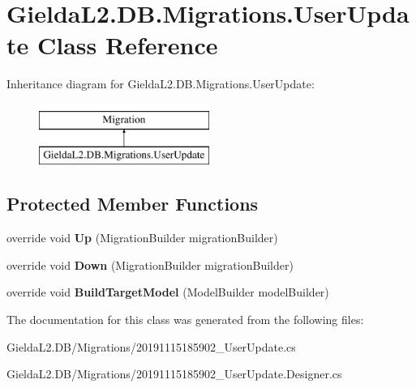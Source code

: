 \hypertarget{class_gielda_l2_1_1_d_b_1_1_migrations_1_1_user_update}{}\section{Gielda\+L2.\+D\+B.\+Migrations.\+User\+Update Class Reference}
\label{class_gielda_l2_1_1_d_b_1_1_migrations_1_1_user_update}
Inheritance diagram for Gielda\+L2.\+D\+B.\+Migrations.\+User\+Update\+:\begin{figure}[H]
\begin{center}
\leavevmode
\includegraphics[height=2.000000cm]{class_gielda_l2_1_1_d_b_1_1_migrations_1_1_user_update}
\end{center}
\end{figure}
\subsection*{Protected Member Functions}
\begin{DoxyCompactItemize}
\item 
\mbox{\label{class_gielda_l2_1_1_d_b_1_1_migrations_1_1_user_update_af487c61591fc0671f54bd68dfd781121}} 
override void {\bfseries Up} (Migration\+Builder migration\+Builder)
\item 
\mbox{\label{class_gielda_l2_1_1_d_b_1_1_migrations_1_1_user_update_acfef253fbb44ac132a02edaad6d692af}} 
override void {\bfseries Down} (Migration\+Builder migration\+Builder)
\item 
\mbox{\label{class_gielda_l2_1_1_d_b_1_1_migrations_1_1_user_update_af939ee9251ed8f7d88a55b1115d1087c}} 
override void {\bfseries Build\+Target\+Model} (Model\+Builder model\+Builder)
\end{DoxyCompactItemize}


The documentation for this class was generated from the following files\+:\begin{DoxyCompactItemize}
\item 
Gielda\+L2.\+D\+B/\+Migrations/20191115185902\+\_\+\+User\+Update.\+cs\item 
Gielda\+L2.\+D\+B/\+Migrations/20191115185902\+\_\+\+User\+Update.\+Designer.\+cs\end{DoxyCompactItemize}
